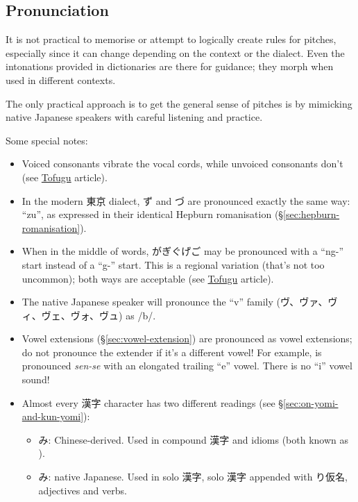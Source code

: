 \documentclass[../nihongo-gakushuu-kyouzai.tex]{subfiles}
\begin{document}
\subsection{Pronunciation} \label{sec:pronunciation}
It is not practical to memorise or attempt to logically create rules for pitches, especially since it can change depending on the context or the dialect. Even the intonations provided in dictionaries are there for guidance; they morph when used in different contexts.

The only practical approach is to get the general sense of pitches is by mimicking native Japanese speakers with careful listening and practice.

Some special notes:
\begin{itemize}
    \item Voiced consonants vibrate the vocal cords, while unvoiced consonants don't (see \href{https://www.tofugu.com/japanese/japanese-pronunciation/\#vocal-cords}{Tofugu} article).
    \item In the modern 東京 dialect, ず and づ are pronounced exactly the same way: ``zu'', as expressed in their identical Hepburn romanisation (\S\ref{sec:hepburn-romanisation}).
    \item When in the middle of words, がぎぐげご may be pronounced with a ``ng-'' start instead of a ``g-'' start. This is a regional variation (that's not too uncommon); both ways are acceptable (see \href{https://www.tofugu.com/japanese/japanese-pronunciation/\#nasal-}{Tofugu} article).
    \item The native Japanese speaker will pronounce the ``v'' family (ヴ、ヴァ、ヴィ、ヴェ、ヴォ、ヴュ) as /b/.
    \item Vowel extensions (\S\ref{sec:vowel-extension}) are pronounced as vowel extensions; do not pronounce the extender if it's a different vowel! For example,  is pronounced \emph{sen-se} with an elongated trailing ``e'' vowel. There is no ``i'' vowel sound!
    \item Almost every 漢字 character has two different readings (see \S\ref{sec:on-yomi-and-kun-yomi}):
    \begin{itemize}
        \item {}み: Chinese-derived. Used in compound 漢字 and idioms (both known as ).
        \item {}み: native Japanese. Used in solo 漢字, solo 漢字 appended with り仮名, adjectives and verbs.


\end{itemize}
\end{itemize}
\end{document}
